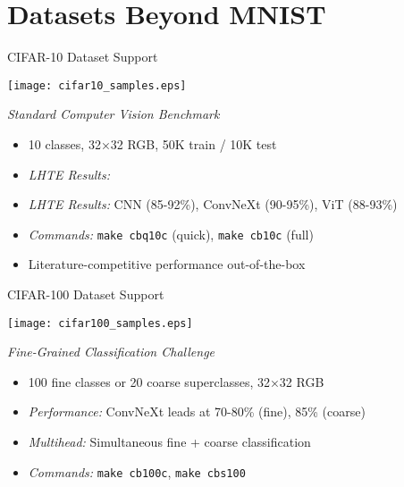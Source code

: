 \section[toc={New Dataset Formats}]{Datasets Beyond MNIST}

\begin{slide}[\slideopts,toc={CIFAR-10}]{CIFAR-10 Dataset Support}
  
  \centerline{\texttt{[image: cifar10\_samples.eps]}}

  \emph{Standard Computer Vision Benchmark}
  
  \begin{itemize}
    \item 10 classes, 32×32 RGB, 50K train / 10K test
    
    \item \emph{LHTE Results:}
    \item \emph{LHTE Results:} CNN (85-92\%), ConvNeXt (90-95\%), ViT (88-93\%)
    
    \item \emph{Commands:} \texttt{make cbq10c} (quick), \quad \texttt{make cb10c} (full)
    
    \item Literature-competitive performance out-of-the-box
  \end{itemize}
  
\end{slide}

\begin{slide}[\slideopts,toc={CIFAR-100}]{CIFAR-100 Dataset Support}
  
  \centerline{\texttt{[image: cifar100\_samples.eps]}}

  \emph{Fine-Grained Classification Challenge}
  
  \begin{itemize}
    \item 100 fine classes or 20 coarse superclasses, 32×32 RGB
    
    \item \emph{Performance:} ConvNeXt leads at 70-80\% (fine), 85\% (coarse)
    
    \item \emph{Multihead:} Simultaneous fine + coarse classification
    
    \item \emph{Commands:} \texttt{make cb100c}, \quad \texttt{make cbs100}

  \end{itemize}
  
\end{slide}

